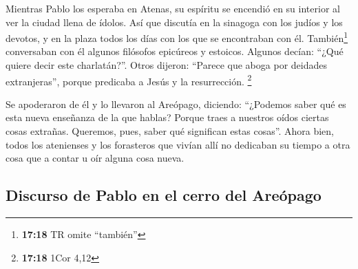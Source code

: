 \begin{paracol}{2}
 Mientras Pablo los esperaba en Atenas, su espíritu se
encendió en su interior al ver la ciudad llena de ídolos.
 Así que discutía en la sinagoga con los judíos y los
devotos, y en la plaza todos los días con los que se encontraban con él.
 También\footnote{\textbf{17:18} TR omite ``también''}
conversaban con él algunos filósofos epicúreos y estoicos. Algunos
decían: ``¿Qué quiere decir este charlatán?''. Otros dijeron: ``Parece
que aboga por deidades extranjeras'', porque predicaba a Jesús y la
resurrección. \footnote{\textbf{17:18} 1Cor 4,12}

 Se apoderaron de él y lo llevaron al Areópago, diciendo:
``¿Podemos saber qué es esta nueva enseñanza de la que hablas?
 Porque traes a nuestros oídos ciertas cosas extrañas.
Queremos, pues, saber qué significan estas cosas''. 
Ahora bien, todos los atenienses y los forasteros que vivían allí no
dedicaban su tiempo a otra cosa que a contar u oír alguna cosa nueva.

\hypertarget{discurso-de-pablo-en-el-cerro-del-areuxf3pago}{%
\subsection{Discurso de Pablo en el cerro del
Areópago}\label{discurso-de-pablo-en-el-cerro-del-areuxf3pago}}


\end{paracol}
